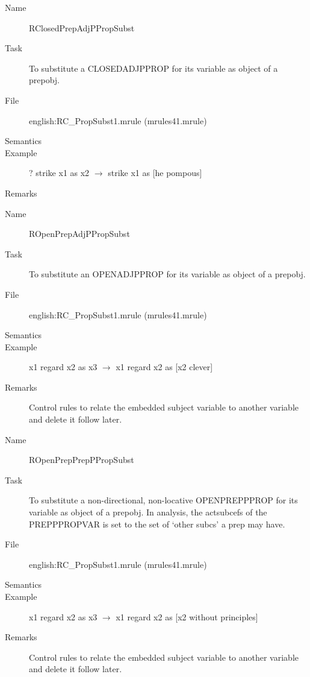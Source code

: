 \begin{description}
\vspace{1 cm}
\begin{description}
\item[Name]   RClosedPrepAdjPPropSubst
\item[Task] To substitute a CLOSEDADJPPROP for its variable as object of a
prepobj.
\item[File] english:RC\_PropSubst1.mrule (mrules41.mrule)
\item[Semantics]
\item[Example] ? strike x1 as x2 $\rightarrow$ strike x1 as [he pompous]
\item[Remarks]
\end{description}

\vspace{1 cm}
\begin{description}
\item[Name] ROpenPrepAdjPPropSubst
\item[Task] To substitute an OPENADJPPROP for its variable as object of a 
prepobj.
\item[File] english:RC\_PropSubst1.mrule (mrules41.mrule)
\item[Semantics]
\item[Example] x1 regard x2 as x3 $\rightarrow$ x1 regard x2 as [x2 clever]
\item[Remarks] Control rules to relate the embedded subject variable to 
another variable and delete it follow later.
\end{description}

\vspace{1 cm}
\begin{description}
\item[Name]   ROpenPrepPrepPPropSubst
\item[Task] To substitute a non-directional, non-locative OPENPREPPPROP for 
its variable as object of a prepobj. In analysis, the actsubcefs of the 
PREPPPROPVAR is set to the set of `other subcs' a prep may have.
\item[File] english:RC\_PropSubst1.mrule (mrules41.mrule)
\item[Semantics]
\item[Example] x1 regard x2 as x3 $\rightarrow$ x1 regard x2 as [x2 without 
principles]
\item[Remarks] Control rules to relate the embedded subject variable to 
another variable and delete it follow later.
\end{description}


\end{description}

